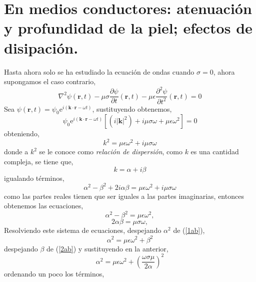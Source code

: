 \documentclass[11pt,fleqn]{book} %
\begin{document}
\section{En medios conductores: atenuaci\'on y profundidad de la piel; efectos de disipaci\'on.}

 Hasta ahora solo se ha estudiado la ecuaci\'on de ondas cuando $\sigma=0$, ahora supongamos el caso contrario,
 \begin{equation*}
 \nabla^2 \psi(\textbf{r},t)-\mu\sigma\frac{\partial \psi}{\partial t}(\textbf{r},t)-\mu\epsilon \frac{\partial^{2} \psi}{\partial t^{2}}(\textbf{r},t)=0
 \end{equation*}
 Sea $\psi(\textbf{r},t)=\psi_0\text{e}^{i(\textbf{k}\cdot\textbf{r}-\omega t)}$, sustituyendo obtenemos,
 \begin{equation*}
 \psi_0\text{e}^{i(\textbf{k}\cdot\textbf{r}- \omega t)}\left[(i|\textbf{k}|^2)+i\mu\sigma\omega+\mu\epsilon\omega^2\right]=0
 \end{equation*}
obteniendo,
 \begin{equation}  \label{dispersion}
 k^2=\mu\epsilon\omega^2+i\mu\sigma\omega
  \end{equation}
 donde a $k^2$ se le conoce como \textit{relaci\'on de dispersi\'on}, como $k$ es una cantidad compleja, se tiene que,
 \begin{equation*}
 k=\alpha+i\beta
 \end{equation*}
igualando t\'erminos,
 \begin{equation*}
 \alpha^2-\beta^2+2i\alpha\beta=\mu\epsilon\omega^2+i\mu\sigma\omega
 \end{equation*}
 como las partes reales tienen que ser iguales a las partes imaginarias, entonces obtenemos las ecuaciones,
 \begin{equation} \label{1ab}
 \alpha^2-\beta^2=\mu\epsilon\omega^2,
 \end{equation}
 \begin{equation} \label{2ab}
 2\alpha\beta=\mu\sigma\omega,
 \end{equation}
Resolviendo este sistema de ecuaciones,
despejando $\alpha^2$ de (\ref{1ab}),
 \begin{equation*}
 \alpha^2=\mu\epsilon\omega^2+\beta^2
 \end{equation*}
despejando $\beta$ de (\ref{2ab}) y sustituyendo en la anterior,
 \begin{equation*}
 \alpha^2=\mu\epsilon\omega^2+\left( \frac{\omega\sigma\mu}{2 \alpha}\right)^2
 \end{equation*}
ordenando un poco los t\'erminos,
\end{document}
